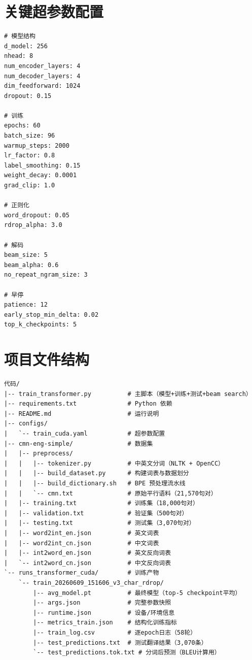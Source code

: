 \documentclass[12pt, a4paper]{ctexart}
\begin{document}
\section{关键超参数配置}

\begin{lstlisting}[style=yaml, caption={完整超参数配置（YAML 格式）}]
# 模型结构
d_model: 256
nhead: 8
num_encoder_layers: 4
num_decoder_layers: 4
dim_feedforward: 1024
dropout: 0.15

# 训练
epochs: 60
batch_size: 96
warmup_steps: 2000
lr_factor: 0.8
label_smoothing: 0.15
weight_decay: 0.0001
grad_clip: 1.0

# 正则化
word_dropout: 0.05
rdrop_alpha: 3.0

# 解码
beam_size: 5
beam_alpha: 0.6
no_repeat_ngram_size: 3

# 早停
patience: 12
early_stop_min_delta: 0.02
top_k_checkpoints: 5
\end{lstlisting}

\section{项目文件结构}

\begin{lstlisting}[basicstyle=\small\ttfamily, frame=single, backgroundcolor=\color{gray!8}, numbers=none, caption={提交文件夹目录结构}]
代码/
|-- train_transformer.py          # 主脚本（模型+训练+测试+beam search）
|-- requirements.txt              # Python 依赖
|-- README.md                     # 运行说明
|-- configs/
|   `-- train_cuda.yaml           # 超参数配置
|-- cmn-eng-simple/               # 数据集
|   |-- preprocess/
|   |   |-- tokenizer.py          # 中英文分词（NLTK + OpenCC）
|   |   |-- build_dataset.py      # 构建词表与数据划分
|   |   |-- build_dictionary.sh   # BPE 预处理流水线
|   |   `-- cmn.txt               # 原始平行语料（21,570句对）
|   |-- training.txt              # 训练集（18,000句对）
|   |-- validation.txt            # 验证集（500句对）
|   |-- testing.txt               # 测试集（3,070句对）
|   |-- word2int_en.json          # 英文词表
|   |-- word2int_cn.json          # 中文词表
|   |-- int2word_en.json          # 英文反向词表
|   `-- int2word_cn.json          # 中文反向词表
`-- runs_transformer_cuda/        # 训练产物
    `-- train_20260609_151606_v3_char_rdrop/
        |-- avg_model.pt          # 最终模型（top-5 checkpoint平均）
        |-- args.json             # 完整参数快照
        |-- runtime.json          # 设备/环境信息
        |-- metrics_train.json    # 结构化训练指标
        |-- train_log.csv         # 逐epoch日志（58轮）
        |-- test_predictions.txt  # 测试翻译结果（3,070条）
        `-- test_predictions.tok.txt # 分词后预测（BLEU计算用）
\end{lstlisting}
\end{document}

